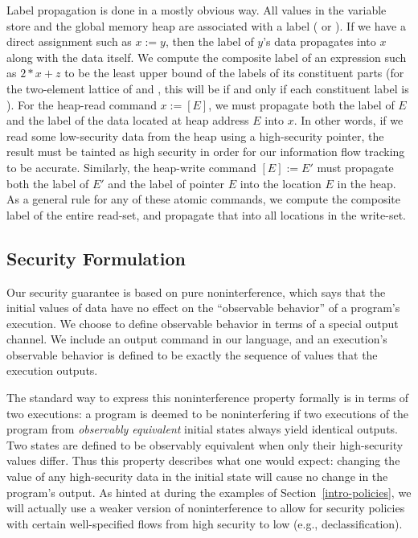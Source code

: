 Label propagation is done in a mostly obvious way. All values in the variable
store and the global memory heap are associated with a label (\lo{} or \hi{}).
If we have a direct assignment such as $x:=y$,
then the label of $y$'s data propagates into $x$ along with the data itself. We compute the composite
label of an expression such as $2*x + z$ to be the least upper bound of the labels of its constituent
parts (for the two-element lattice of \lo{} and \hi{}, this will be \lo{} if and only if each 
constituent label is \lo{}). For the heap-read command $x:=[E]$, we must propagate both the 
label of $E$ and the label of the data located at heap address $E$ into $x$. In other words, if
we read some low-security data from the heap using a high-security pointer, the result must
be tainted as high security in order for our information flow tracking to be accurate.
Similarly, the heap-write command $[E]:=E'$ must propagate both the label of $E'$ and the label of 
pointer $E$ into the location $E$ in the heap. As a general rule for any of these atomic commands,
we compute the composite label of the entire read-set, and propagate that into all locations in
the write-set.

\subsection{Security Formulation}

Our security guarantee is based on pure noninterference,
which says that the initial values of \hi{} data have no effect on the ``observable behavior'' of
a program's execution. We choose to define observable behavior in terms of a special output channel.
We include an output command in our language, and an execution's observable behavior is defined to
be exactly the sequence of values that the execution outputs.

The standard way to express this noninterference property formally is in terms of two executions:
a program is deemed to be noninterfering if two executions of the program from \emph{observably
equivalent} initial states always yield identical outputs. Two states are defined to be observably
equivalent when only their high-security values differ. Thus this property describes what one would 
expect: changing the value of any high-security data in the initial state will cause no change in 
the program's output. As hinted at during the examples of Section~\ref{intro-policies}, we will 
actually use a weaker version of noninterference to allow for security policies with certain 
well-specified flows from high security to low (e.g., declassification).

